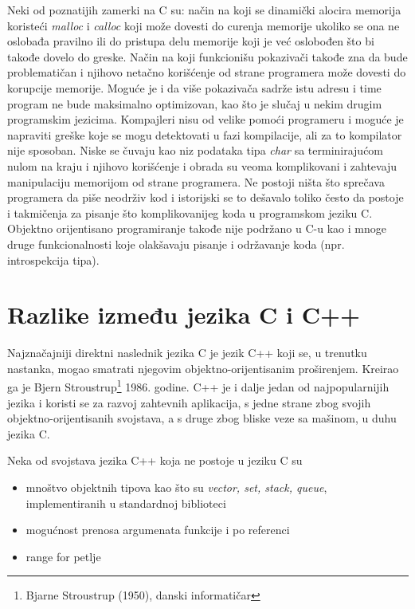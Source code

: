\documentclass[a4paper]{article}
\begin{document}
{Neki od poznatijih zamerki na C su: način na koji se dinamički alocira memorija koristeći {\em malloc} i {\em calloc} koji može dovesti do curenja memorije ukoliko se ona ne oslobađa pravilno ili do pristupa delu memorije koji je već oslobođen što bi takođe dovelo do greske. Način na koji funkcionišu pokazivači takođe zna da bude problematičan i njihovo netačno korišćenje od strane programera može dovesti do korupcije memorije. Moguće je i da više pokazivača sadrže istu adresu i time program ne bude maksimalno optimizovan, kao što je slučaj u nekim drugim programskim jezicima. Kompajleri nisu od velike pomoći programeru i moguće je napraviti greške koje se mogu detektovati u fazi kompilacije, ali za to kompilator nije sposoban. Niske se čuvaju kao niz podataka tipa {\em char} sa terminirajućom nulom na kraju i njihovo korišćenje i obrada su veoma komplikovani i zahtevaju manipulaciju memorijom od strane programera. Ne postoji ništa što sprečava programera da piše neodrživ kod i istorijski se to dešavalo toliko često da postoje i takmičenja za pisanje što komplikovanijeg koda u programskom jeziku C. Objektno orijentisano programiranje takođe nije podržano u C-u kao i mnoge druge funkcionalnosti koje olakšavaju pisanje i održavanje koda (npr. introspekcija tipa).

\section{Razlike između jezika C i C++}
Najznačajniji direktni naslednik jezika C je jezik C++ koji se, u trenutku nastanka, mogao smatrati njegovim objektno-orijentisanim proširenjem. Kreirao ga je Bjern Stroustrup\footnote{Bjarne Stroustrup (1950), danski informatičar} 1986. godine. C++ je i dalje jedan od najpopularnijih jezika i koristi se za razvoj zahtevnih aplikacija, s jedne strane zbog svojih objektno-orijentisanih svojstava, a s druge zbog bliske veze sa mašinom, u duhu jezika C.

Neka od svojstava jezika C++ koja ne postoje u jeziku C su
\begin{itemize}
    \item mnoštvo objektnih tipova kao što su {\em vector, set, stack, queue}, implementiranih u standardnoj biblioteci
    \item mogućnost prenosa argumenata funkcije i po referenci
    \item range for petlje
\end{itemize}

}
\end{document}
